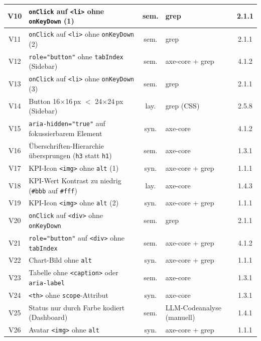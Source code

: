 \begin{longtable}{|c|p{6.4cm}|c|p{4.0cm}|c|}
V10 & \texttt{onClick} auf \texttt{<li>} ohne \texttt{onKeyDown} (1)& sem. & grep                    & 2.1.1 \\ \hline
V11 & \texttt{onClick} auf \texttt{<li>} ohne \texttt{onKeyDown} (2)& sem. & grep                    & 2.1.1 \\ \hline
V12 & \texttt{role="button"} ohne \texttt{tabIndex} (Sidebar)       & sem. & axe-core + grep         & 4.1.2 \\ \hline
V13 & \texttt{onClick} auf \texttt{<li>} ohne \texttt{onKeyDown} (3)& sem. & grep                    & 2.1.1 \\ \hline
V14 & Button 16$\times$16\,px $<$ 24$\times$24\,px (Sidebar)        & lay. & grep (CSS)              & 2.5.8 \\ \hline
V15 & \texttt{aria-hidden="true"} auf fokussierbarem Element        & syn. & axe-core                & 4.1.2 \\ \hline
V16 & Überschriften-Hierarchie übersprungen (\texttt{h3} statt \texttt{h1}) & sem. & axe-core        & 1.3.1 \\ \hline
V17 & KPI-Icon \texttt{<img>} ohne \texttt{alt} (1)                 & syn. & axe-core + grep         & 1.1.1 \\ \hline
V18 & KPI-Wert Kontrast zu niedrig (\texttt{\#bbb} auf \texttt{\#fff}) & lay. & axe-core             & 1.4.3 \\ \hline
V19 & KPI-Icon \texttt{<img>} ohne \texttt{alt} (2)                 & syn. & axe-core + grep         & 1.1.1 \\ \hline
V20 & \texttt{onClick} auf \texttt{<div>} ohne \texttt{onKeyDown}   & sem. & grep                    & 2.1.1 \\ \hline
V21 & \texttt{role="button"} auf \texttt{<div>} ohne \texttt{tabIndex} & sem. & axe-core + grep      & 4.1.2 \\ \hline
V22 & Chart-Bild ohne \texttt{alt}                                  & syn. & axe-core + grep         & 1.1.1 \\ \hline
V23 & Tabelle ohne \texttt{<caption>} oder \texttt{aria-label}      & sem. & axe-core                & 1.3.1 \\ \hline
V24 & \texttt{<th>} ohne \texttt{scope}-Attribut                    & syn. & axe-core                & 1.3.1 \\ \hline
V25 & Status nur durch Farbe kodiert (Dashboard)                    & sem. & LLM-Codeanalyse (manuell)& 1.4.1 \\ \hline
V26 & Avatar \texttt{<img>} ohne \texttt{alt}                       & syn. & axe-core + grep         & 1.1.1 \\ \hline

\end{longtable}
